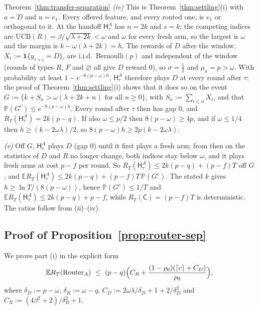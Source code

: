 \documentclass[anon]{alt2027} %
\newcommand{\Prb}{\mathbb{P}}
\newcommand{\E}{\mathbb{E}}
\newcommand{\ind}{\mathbf{1}}
\newcommand{\Cold}{\mathsf{C}}
\newcommand{\Hyb}{\mathsf{H}}
\begin{document}
\begin{proofof}{Theorem~\ref{thm:transfer-separation}}
\emph{(iv)} This is Theorem~\ref{thm:settling}(i) with $a=D$ and $u=e_1$.
Every offered feature, and every routed one, is $e_1$ or orthogonal to it.
At the handoff $\Hyb^A_\tau$ has $n=2k$ and $s=k$; the competing indices are
$\mathrm{UCB}(R)=\beta/\sqrt{\lambda+2k}<\omega$ and $\omega$ for every fresh
arm, so the largest is $\omega$ and the margin is
$k-\omega(\lambda+2k)=h$. The rewards of $D$ after the window,
$X_i:=\ind\{y_{\tau+i}=D\}$, are i.i.d.\ Bernoulli$(p)$ and independent of
the window (rounds of types $R$, $F$ and $\varnothing$ all give $D$ reward
$0$), so $\sigma=\frac12$ and $\mu_a=p>\omega$. With probability at least
$1-e^{-8(p-\omega)h}$, $\Hyb^A_\tau$ therefore plays $D$ at every round after
$\tau$: the proof of Theorem~\ref{thm:settling}(i) shows that it does so on
the event $G:=\{k+S_n>\omega(\lambda+2k+n)\text{ for all }n\ge0\}$, with
$S_n:=\sum_{i\le n}X_i$, and that $\Prb(G^c)\le e^{-8(p-\omega)h}$. Every
round after $\tau$ then has gap $0$, and
$R_T(\Hyb^A_\tau)=2k(p-q)$. If also $\omega\le p/2$ then
$8(p-\omega)\ge4p$, and if $\omega\le1/4$ then $h\ge(k-2\omega\lambda)/2$, so
$8(p-\omega)h\ge2p(k-2\omega\lambda)$.

\emph{(v)} Off $G$, $\Hyb^A_\tau$ plays $D$ (gap $0$) until it first plays a
fresh arm; from then on the statistics of $D$ and $R$ no longer change, both
indices stay below $\omega$, and it plays fresh arms at cost $p-f$ per round.
So $R_T(\Hyb^A_\tau)\le2k(p-q)+(p-f)T$ off $G$, and
$\E R_T(\Hyb^A_\tau)\le2k(p-q)+(p-f)T\,\Prb(G^c)$. The stated $k$ gives
$h\ge\ln T/(8(p-\omega))$, hence $\Prb(G^c)\le1/T$ and
$\E R_T(\Hyb^A_\tau)\le2k(p-q)+p-f$, while $R_T(\Cold)=(p-f)T$ is
deterministic. The ratios follow from (ii)--(iv).
\end{proofof}

\subsection{Proof of Proposition~\ref{prop:router-sep}}
\label{app:proof-router-sep}

We prove part (i) in the explicit form
\[
\E R_T(\mathrm{Router}_A)\ \le\ (p-q)\Bigl(C_R+\frac{(1-\rho_0)(\lceil c\rceil+C_D)}{\rho_0}\Bigr),
\]
where $\delta_D:=p-\omega$, $\delta_R:=\omega-q$,
$C_D:=2\omega\lambda/\delta_D+1+2/\delta_D^2$ and
$C_R:=(4\beta^2+2)/\delta_R^2+1$.
\end{document}
